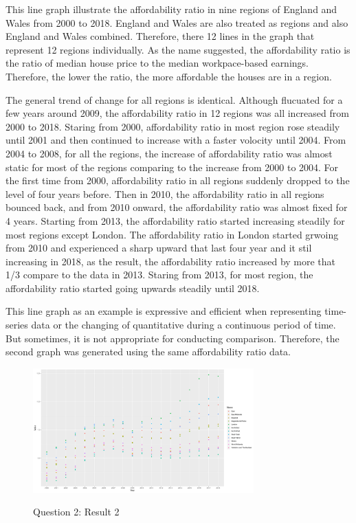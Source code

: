 \documentclass{article}
\begin{document}
This line graph illustrate the affordability ratio in nine regions of England and Wales from 2000 to 2018. 
England and Wales are also treated as regions and also England and Wales combined. Therefore, there 12 lines 
in the graph that represent 12 regions individually. As the name suggested, the affordability ratio is the 
ratio of median house price to the median workpace-based earnings. Therefore, the lower the ratio, the more 
affordable the houses are in a region.

The general trend of change for all regions is identical. Although flucuated for a few years around 2009, 
the affordability ratio in 12 regions was all increased from 2000 to 2018. Staring from 2000, affordability ratio 
in most region rose steadily until 2001 and then continued to increase with a faster volocity until 2004. 
From 2004 to 2008, for all the regions, the increase of affordability ratio was almost static for most of 
the regions comparing to the increase from 2000 to 2004. For the first time from 2000, affordability ratio 
in all regions suddenly dropped to the level of four years before. Then in 2010, the affordability ratio in 
all regions bounced back, and from 2010 onward, the affordability ratio was almost fixed for 4 years. Starting from 2013, 
the affordability ratio started increasing steadily for most regions except London. The affordability ratio in London 
started grwoing from 2010 and experienced a sharp upward that last four year and it stil increasing in 2018, 
as the result, the affordability ratio increased by more that 1/3 compare to the data in 2013. Staring from 2013, 
for most region, the affordability ratio started going upwards steadily until 2018.

This line graph as an example is expressive and efficient when representing time-series data or the changing 
of quantitative during a continuous period of time. But sometimes, it is not appropriate for conducting 
comparison. Therefore, the second graph was generated using the same affordability ratio data.

\begin{figure}[htb]
  \begin{minipage}[b]{1.0\linewidth}
    \centering
    \centerline{\includegraphics[width=8.5cm]{Q2Geom_point}}
    \centerline{Question 2: Result 2}\medskip
  \end{minipage}
\end{figure}
\end{document}
